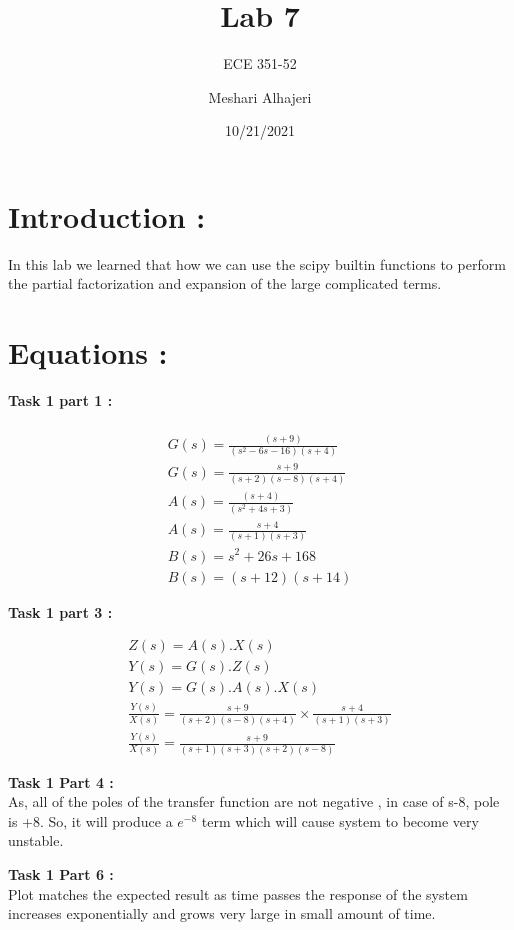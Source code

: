 \documentclass[11pt]{article}
\title{Lab 7}
\author{ECE 351-52}
\author{Meshari Alhajeri}
\date{10/21/2021}
\begin{document}
\maketitle
\section{Introduction :}
In this lab we learned that how we can use the scipy builtin functions to perform the partial factorization and expansion of the large complicated terms.
\section{Equations :}


\textbf{Task 1 part 1 :}

\begin{align*}
\\ G(s) = \frac{\left(s+9\right)}{\left(s^2-6s-16\right)\left(s+4\right)} 
\\ G(s) = \frac{s+9}{\left(s+2\right)\left(s-8\right)\left(s+4\right)}
\\A(s) = \frac{\left(s+4\right)}{\left(s^2+4s+3\right)}
\\A(s) = \frac{s+4}{\left(s+1\right)\left(s+3\right)}
\\B(s) = s^2+26s+168
\\B(s) = \left(s+12\right)\left(s+14\right)
\end{align*}

\textbf{Task 1 part 3 :}

\begin{align*}
Z(s) = A(s).X(s)
\\ Y(s) = G(s).Z(s)
\\ Y(s) = G(s).A(s).X(s)
\\ \frac{Y(s)}{X(s)} = \frac{s+9}{\left(s+2\right)\left(s-8\right)\left(s+4\right)} \times \frac{s+4}{\left(s+1\right)\left(s+3\right)}
\\ \frac{Y(s)}{X(s)} =\frac{s+9}{\left(s+1\right)\left(s+3\right)\left(s+2\right)\left(s-8\right)}
\end{align*}

\textbf{Task 1 Part 4 :}
\\ As, all of the poles of the transfer function are not negative , in case of s-8, pole is +8. So, it will produce a $e^{-8}$ term which will cause system to become very unstable.

\textbf{Task 1 Part 6 :}
\\ Plot matches the expected result as time passes the response of the system increases exponentially and grows very large in small amount of time.
\end{document}
